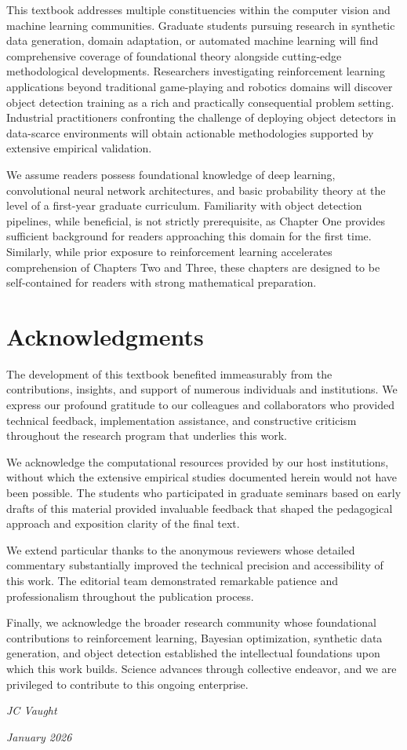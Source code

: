 This textbook addresses multiple constituencies within the computer vision and machine learning communities. Graduate students pursuing research in synthetic data generation, domain adaptation, or automated machine learning will find comprehensive coverage of foundational theory alongside cutting-edge methodological developments. Researchers investigating reinforcement learning applications beyond traditional game-playing and robotics domains will discover object detection training as a rich and practically consequential problem setting. Industrial practitioners confronting the challenge of deploying object detectors in data-scarce environments will obtain actionable methodologies supported by extensive empirical validation.

We assume readers possess foundational knowledge of deep learning, convolutional neural network architectures, and basic probability theory at the level of a first-year graduate curriculum. Familiarity with object detection pipelines, while beneficial, is not strictly prerequisite, as Chapter One provides sufficient background for readers approaching this domain for the first time. Similarly, while prior exposure to reinforcement learning accelerates comprehension of Chapters Two and Three, these chapters are designed to be self-contained for readers with strong mathematical preparation.

\section*{Acknowledgments}

The development of this textbook benefited immeasurably from the contributions, insights, and support of numerous individuals and institutions. We express our profound gratitude to our colleagues and collaborators who provided technical feedback, implementation assistance, and constructive criticism throughout the research program that underlies this work.

We acknowledge the computational resources provided by our host institutions, without which the extensive empirical studies documented herein would not have been possible. The students who participated in graduate seminars based on early drafts of this material provided invaluable feedback that shaped the pedagogical approach and exposition clarity of the final text.

We extend particular thanks to the anonymous reviewers whose detailed commentary substantially improved the technical precision and accessibility of this work. The editorial team demonstrated remarkable patience and professionalism throughout the publication process.

Finally, we acknowledge the broader research community whose foundational contributions to reinforcement learning, Bayesian optimization, synthetic data generation, and object detection established the intellectual foundations upon which this work builds. Science advances through collective endeavor, and we are privileged to contribute to this ongoing enterprise.

\vspace{1cm}
\hfill \textit{JC Vaught}

\hfill \textit{January 2026}
